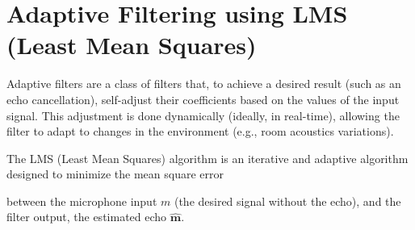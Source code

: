 \section{Adaptive Filtering using LMS (Least Mean Squares)}

Adaptive filters are a class of filters that, to achieve a desired
result (such as an echo cancellation), self-adjust their coefficients
based on the values of the input signal. This adjustment is done
dynamically (ideally, in real-time), allowing the filter to adapt to
changes in the environment (e.g., room acoustics variations).

The LMS (Least Mean Squares) algorithm is an iterative and adaptive
algorithm designed to minimize the mean square error
\begin{equation}
  
\end{equation}

between the microphone
input $m$ (the desired signal without the echo), and the filter
output, the estimated echo $\hat{\mathbf m}$.

